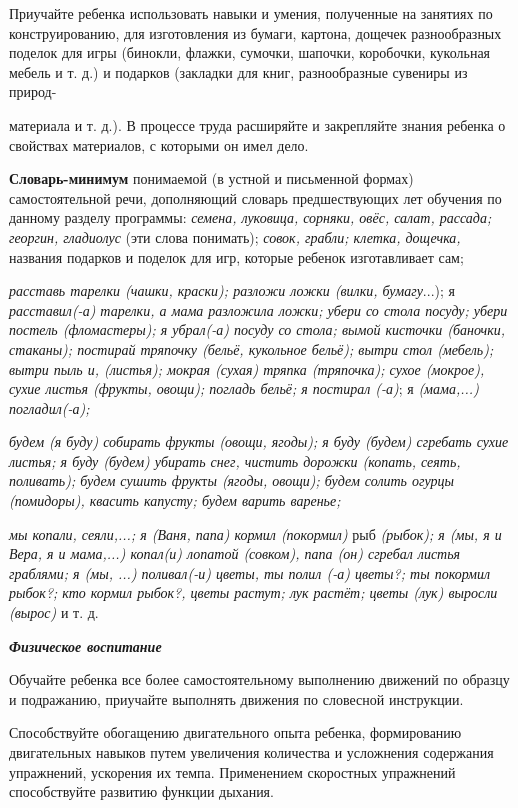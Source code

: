 \documentclass[a5paper]{book}
\renewcommand{\emph}[1]{\textit{#1}}
\begin{document}
Приучайте ребенка использовать навыки и умения, полученные на занятиях
по конструированию, для изготовления из бумаги, картона, дощечек
разнообразных поделок для игры (бинокли, флажки, сумочки, шапочки,
коробочки, кукольная мебель и т. д.) и подарков (закладки для книг,
разнообразные сувениры из природ-

материала и т. д.). В процессе труда расширяйте и закрепляйте знания
ребенка о свойствах материалов, с которыми он имел дело.

\textbf{Словарь-минимум} понимаемой (в устной и письменной формах)
самостоятельной речи, дополняющий словарь предшествующих лет обучения по
данному разделу программы: \emph{семена, луковица, сорняки, овёс, салат,
рассада; георгин, гладиолус} (эти слова понимать); \emph{совок, грабли;
клетка, дощечка,} названия подарков и поделок для игр, которые ребенок
изготавливает сам;

\emph{расставь тарелки (чашки, краски); разложи ложки (вилки,
бумагу}...); я \emph{расставил(-а) тарелки, а мама разложила ложки;
убери со стола посуду; убери постель (фломастеры); я убрал(-а) посуду со
стола; вымой кисточки (баночки, стаканы); постирай тряпочку (бельё,
кукольное бельё); вытри стол (мебель); вытри пыль и, (листья); мокрая
(сухая) тряпка (тряпочка); сухое (мокрое), сухие листья (фрукты, овощи);
погладь бельё; я постирал (-а)}; я \emph{(мама,...) погладил(-а);}

\emph{будем (я буду) собирать фрукты (овощи, ягоды); я буду (будем)
сгребать сухие листья; я буду (будем) убирать снег, чистить дорожки
(копать, сеять, поливать); будем сушить фрук}т\emph{ы (ягоды, овощи);
будем солить огурцы (помидоры), квасить капусту; будем варить варенье;}

\emph{мы копали, сеяли,...; я (Ваня, папа) кормил (покормил)} рыб
\emph{(рыбок); я (мы, я и Вера, я и мама,...) копал(и) лопатой (совком),
папа (он) сгребал листья граблями; я (мы, ...) поливал(-и) цветы, ты
полил (-а) цветы?; ты покормил рыбок?; кто кормил рыбок?, цветы растут;
лук растёт; цветы (лук) выросли (вырос)} и т. д.

\emph{\textbf{Физическое воспитание}}

Обучайте ребенка все более самостоятельному выполнению движений по
образцу и подражанию, приучайте выполнять движения по словесной
инструкции.

Способствуйте обогащению двигательного опыта ребенка, формированию
двигательных навыков путем увеличения количества и усложнения содержания
упражнений, ускорения их темпа. Применением скоростных упражнений
способствуйте развитию функции дыхания.
\end{document}
